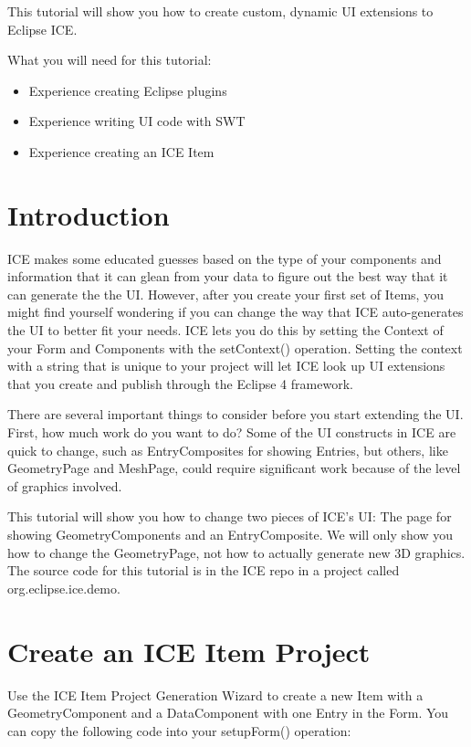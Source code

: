 This tutorial will show you how to create custom, dynamic UI extensions to
Eclipse ICE.

What you will need for this tutorial:
\begin{itemize}
\item Experience creating Eclipse plugins
\item Experience writing UI code with SWT
\item Experience creating an ICE Item
\end{itemize}

\section{Introduction}

ICE makes some educated guesses based on the type of your components and
information that it can glean from your data to figure out the best way that it
can generate the the UI. However, after you create your first set of Items, you
might find yourself wondering if you can change the way that ICE auto-generates
the UI to better fit your needs. ICE lets you do this by setting the Context of
your Form and Components with the setContext() operation. Setting the context
with a string that is unique to your project will let ICE look up UI extensions
that you create and publish through the Eclipse 4 framework.

There are several important things to consider before you start extending the
UI. First, how much work do you want to do? Some of the UI constructs in ICE
are quick to change, such as EntryComposites for showing Entries, but others,
like GeometryPage and MeshPage, could require significant work because of the
level of graphics involved.

This tutorial will show you how to change two pieces of ICE’s UI: The page for
showing GeometryComponents and an EntryComposite. We will only show you how to
change the GeometryPage, not how to actually generate new 3D graphics. The
source code for this tutorial is in the ICE repo in a project called
org.eclipse.ice.demo.

\section{Create an ICE Item Project}

Use the ICE Item Project Generation Wizard to create a new Item with  a
GeometryComponent and a DataComponent with one Entry in the Form. You can copy
the following code into your setupForm() operation:

